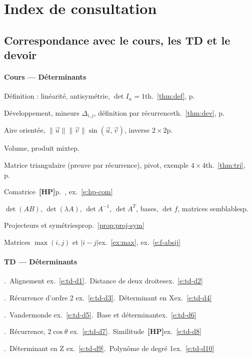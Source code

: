 \documentclass[a4paper,11pt]{article}
\numberwithin{equation}{section}
\numberwithin{figure}{section}
\numberwithin{table}{section}
\theoremstyle{enonce}
\theoremstyle{exemple}
\theoremstyle{remarque}
\newcommand{\ve}[1]{\vec{#1}}
\newif\ifonglets \ongletsfalse
\newcommand{\HP}{\,{\sffamily\bfseries\scriptsize\textcolor{Brique}{[HP]}}}
\begin{document}
\clearpage
\ongletsfalse
\section*{Index de consultation}\label{sec:index}

\subsection*{Correspondance avec le cours, les TD et le devoir}\label{sec:corresp}
{\footnotesize

\paragraph{Cours --- Déterminants}
\noindent Définition : linéarité, antisymétrie, $\det I_n=1$\dotfill th.~\ref{thm:def}, p.~\pageref{thm:def}\par
\noindent Développement, mineurs $\Delta_{i,j}$, définition par récurrence\dotfill th.~\ref{thm:dev}, p.~\pageref{thm:dev}\par
\noindent Aire orientée, $\|\ve u\|\|\ve v\|\sin(\ve u,\ve v)$, inverse $2\times2$\dotfill p.~\pageref{prop:col}\par
\noindent Volume, produit mixte\dotfill p.~\pageref{eq:det3}\par
\noindent Matrice triangulaire (preuve par récurrence), pivot, exemple $4\times4$\dotfill th.~\ref{thm:tri}, p.~\pageref{thm:tri}\par
\noindent Comatrice \HP\dotfill p.~\pageref{hp:comatrice}, ex.~\ref{e:hp-com}\par
\noindent $\det(AB)$, $\det(\lambda A)$, $\det A^{-1}$, $\det A^T$, bases, $\det f$, matrices semblables\dotfill p.~\pageref{thm:fond}\par
\noindent Projecteurs et symétries\dotfill prop.~\ref{prop:proj-sym}\par
\noindent Matrices $\max(i,j)$ et $|i-j|$\dotfill ex.~\ref{ex:max}, ex.~\ref{e:f-absij}\par
\paragraph{TD --- Déterminants}
.~Alignement \dotfill ex.~\ref{e:td-d1}.~Distance de deux droites\dotfill ex.~\ref{e:td-d2}\par
{}.~Récurrence d'ordre 2 \dotfill ex.~\ref{e:td-d3}.~Déterminant en X\dotfill ex.~\ref{e:td-d4}\par
{}.~Vandermonde \dotfill ex.~\ref{e:td-d5}.~Base et déterminant\dotfill ex.~\ref{e:td-d6}\par
{}.~Récurrence, $2\cos\theta$ \dotfill ex.~\ref{e:td-d7}.~Similitude \HP\dotfill ex.~\ref{e:td-d8}\par
{}.~Déterminant en Z \dotfill ex.~\ref{e:td-d9}.~Polynôme de degré 1\dotfill ex.~\ref{e:td-d10}\par
}
\end{document}

